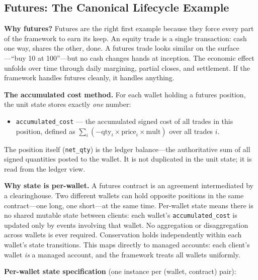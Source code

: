 \documentclass[11pt,a4paper]{article}
\begin{document}
\subsection{Futures: The Canonical Lifecycle Example}

\noindent\textbf{Why futures?}
Futures are the right first example because they force every part of the framework to earn its keep.
An equity trade is a single transaction: cash one way, shares the other, done.
A futures trade looks similar on the surface---``buy 10 at 100''---but no cash changes hands at inception.
The economic effect unfolds over time through daily margining, partial closes, and settlement.
If the framework handles futures cleanly, it handles anything.

\medskip
\noindent\textbf{The accumulated cost method.}
For each wallet holding a futures position, the unit state stores exactly \emph{one} number:

\begin{itemize}[nosep]
\item \texttt{accumulated\_cost} --- the accumulated signed cost of all trades in this position, defined as $\sum_i (-\text{qty}_i \times \text{price}_i \times \text{mult})$ over all trades $i$.
\end{itemize}

\noindent The position itself (\texttt{net\_qty}) is the ledger balance---the authoritative sum of all signed quantities posted to the wallet.
It is not duplicated in the unit state; it is read from the ledger view.

\medskip
\noindent\textbf{Why state is per-wallet.}
A futures contract is an agreement intermediated by a clearinghouse.
Two different wallets can hold opposite positions in the same contract---one long, one short---at the same time.
Per-wallet state means there is no shared mutable state between clients: each wallet's \texttt{accumulated\_cost} is updated only by events involving that wallet.
No aggregation or disaggregation across wallets is ever required.
Conservation holds independently within each wallet's state transitions.
This maps directly to managed accounts: each client's wallet \emph{is} a managed account, and the framework treats all wallets uniformly.

\medskip
\noindent\textbf{Per-wallet state specification} (one instance per (wallet, contract) pair):
\end{document}
